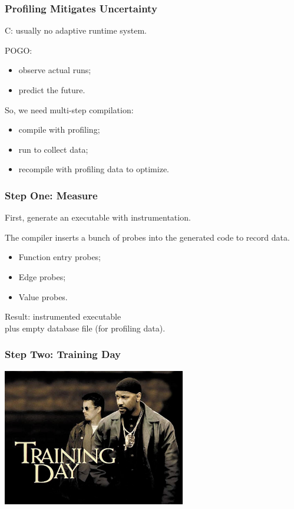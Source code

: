 \begin{frame}
\frametitle{Profiling Mitigates Uncertainty}


\begin{changemargin}{2cm}
C: usually no adaptive runtime system.

POGO:
\begin{itemize}
\item observe actual runs;
\item predict the future.
\end{itemize}

So, we need multi-step compilation:
\begin{itemize}
\item compile with profiling;
\item run to collect data;
\item recompile with profiling data to optimize.
\end{itemize}

\end{changemargin}

\end{frame}



\begin{frame}
\frametitle{Step One: Measure}


\begin{changemargin}{2cm}
First, generate an executable with instrumentation. 

The compiler inserts a bunch of probes into the generated code to record data. 
\begin{itemize}
\item Function entry probes;
\item Edge probes;
\item Value probes.
\end{itemize}

Result: instrumented executable \\
plus empty database file (for profiling data).
\end{changemargin}

\end{frame}



\begin{frame}
\frametitle{Step Two: Training Day}

\begin{center}
	\includegraphics[width=0.6\textwidth]{images/training-day.jpg}
\end{center}

\end{frame}


